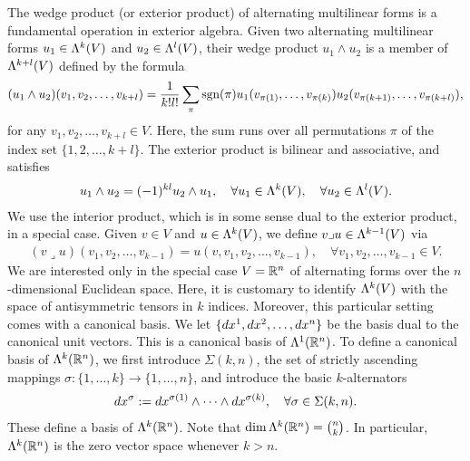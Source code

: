 \documentclass[10pt,letterpaper]{article}
\begin{document}
The wedge product (or exterior product) of alternating multilinear forms is a fundamental operation in exterior algebra. 
Given two alternating multilinear forms \( u_1 \in \Lambda^{k}(V) \) and \( u_2 \in \Lambda^{l}(V) \), 
their wedge product \( u_1 \wedge u_2 \) is a member of $\Lambda^{k+l}(V)$
defined by the formula 
\begin{gather*}
    (u_1 \wedge u_2)(v_1, v_2, \ldots, v_{k+l}) 
    = 
    \frac{1}{k! l!} 
    \sum_{ \pi } 
    \operatorname{sgn}(\pi) 
    u_1( v_{\pi(  1)}, \ldots, v_{\pi(k  )} ) 
    u_2( v_{\pi(k+1)}, \ldots, v_{\pi(k+l)} ),
\end{gather*}
for any \( v_1, v_2, \ldots, v_{k+l} \in V \).
Here, the sum runs over all permutations $\pi$ of the index set \(\{ 1, 2, \ldots, k+l \}\).
The exterior product is bilinear and associative, and satisfies 
\begin{align*}
    u_1 \wedge u_2 = (-1)^{kl} u_2 \wedge u_1,
    \quad 
    \forall u_1 \in \Lambda^{k}(V),
    \quad 
    \forall u_2 \in \Lambda^{l}(V).
\end{align*}
We use the interior product, which is in some sense dual to the exterior product, in a special case. Given $v \in V$ and $u \in \Lambda^{k}(V)$, we define $v \lrcorner u \in \Lambda^{k-1}(V)$ via 
\begin{align*}
    (v \lrcorner u)( v_1, v_2, \ldots, v_{k-1} ) = u( v, v_1, v_2, \ldots, v_{k-1} ),
    \quad 
    \forall v_1, v_2, \ldots, v_{k-1} \in V.
\end{align*}
We are interested only in the special case $V = {\mathbb R}^{n}$ of alternating forms over the $n$-dimensional Euclidean space. 
Here, it is customary to identify $\Lambda^{k}(V)$ with the space of antisymmetric tensors in $k$ indices. 
Moreover, this particular setting comes with a canonical basis. 
We let \(\{dx^1, dx^2, \ldots, dx^{n}\}\) be the basis dual to the canonical unit vectors.
This is a canonical basis of $\Lambda^{1}({\mathbb R}^{n})$. 
To define a canonical basis of $\Lambda^{k}({\mathbb R}^{n})$, 
we first introduce $\Sigma(k,n)$, the set of strictly ascending mappings $\sigma : \{1,\dots,k\} \rightarrow \{1,\dots,n\}$,
and introduce the basic $k$-alternators 
\begin{align*}
    dx^{\sigma} := dx^{\sigma(1)} \wedge \dots \wedge dx^{\sigma(k)}, 
    \quad 
    \forall \sigma \in \Sigma(k,n). 
\end{align*}
These define a basis of $\Lambda^{k}({\mathbb R}^{n})$.
Note that 
$\dim \Lambda^{k}({\mathbb R}^{n}) = \binom{n}{k}$. 
In particular, $\Lambda^{k}({\mathbb R}^{n})$ is the zero vector space whenever $k > n$.
\end{document}
